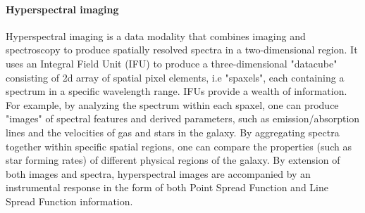 \documentclass[dvipsnames,table]{article}
\begin{document}



\paragraph{Hyperspectral imaging} Hyperspectral imaging is a data modality that combines imaging and spectroscopy to produce spatially resolved spectra in a two-dimensional region. It uses an Integral Field Unit (IFU) to produce a three-dimensional "datacube" consisting of 2d array of spatial pixel elements, i.e "spaxels", each containing a spectrum in a specific wavelength range. IFUs provide a wealth of information. For example, by analyzing the spectrum within each spaxel, one can produce "images" of spectral features and derived parameters, such as emission/absorption lines and the velocities of gas and stars in the galaxy. By aggregating spectra together within specific spatial regions, one can compare the properties (such as star forming rates) of different physical regions of the galaxy. By extension of both images and spectra, hyperspectral images are accompanied by an instrumental response in the form of both Point Spread Function and Line Spread Function information.
\end{document}
